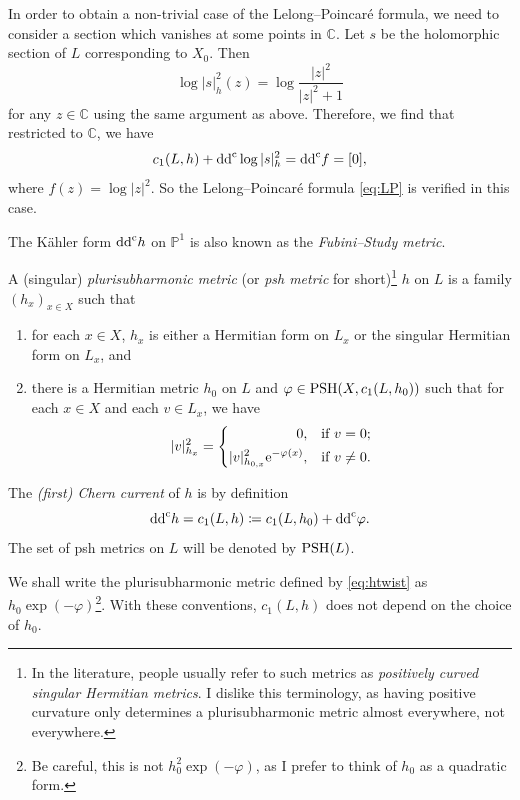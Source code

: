 \begin{example}
    In order to obtain a non-trivial case of the Lelong--Poincaré formula, we need to consider a section which vanishes at some points in $\mathbb{C}$. Let $s$ be the holomorphic section of $L$ corresponding to $X_0$. Then
    \[
    \log |s|_h^2(z)=\log \frac{|z|^2}{|z|^2+1}
    \]
    for any $z\in \mathbb{C}$ using the same argument as above. Therefore, we find that restricted to $\mathbb{C}$, we have
    \[
    c_1(L,h)+\mathrm{dd}^{\mathrm{c}} \log |s|_h^2=\mathrm{dd}^{\mathrm{c}} f=[0],
    \]
    where $f(z)=\log|z|^2$. So the Lelong--Poincaré formula \eqref{eq:LP} is verified in this case.

    The K\"ahler form $\mathrm{dd}^{\mathrm{c}} h$ on $\mathbb{P}^1$ is also known as the \emph{Fubini--Study metric}.
\end{example}


\begin{definition}\label{def:pshfunctions:L1836}
    A (singular) \emph{plurisubharmonic metric} (or \emph{psh metric} for short)\footnote{In the literature, people usually refer to such metrics as \emph{positively curved singular Hermitian metrics}. I dislike this terminology, as having positive curvature only determines a plurisubharmonic metric almost everywhere, not everywhere.} $h$ on $L$ is a family $(h_x)_{x\in X}$ such that
    \begin{enumerate}
        \item\label{itm:chapter-pshfunctions:L1857:1} for each $x\in X$, $h_x$ is either a Hermitian form on $L_x$ or the singular Hermitian form on $L_x$, and
        \item\label{itm:chapter-pshfunctions:L1857:2} there is a Hermitian metric $h_0$ on $L$ and $\varphi\in \mathrm{PSH}(X,c_1(L,h_0))$ such that for each $x\in X$ and each $v\in L_x$, we have
        \begin{equation}\label{eq:htwist}
        |v|^2_{h_x}=
        \left\{
        \begin{aligned}
            0,&\quad \textup{if }v=0;\\
            |v|^2_{h_{0,x}}\mathrm{e}^{-\varphi(x)},&\quad \textup{if }v\neq 0.
        \end{aligned}
        \right.
        \end{equation}
    \end{enumerate}
    The \emph{(first) Chern current} of $h$ is by definition
    \[
    \mathrm{dd}^{\mathrm{c}} h=c_1(L,h)\coloneqq c_1(L,h_0)+\mathrm{dd}^{\mathrm{c}}\varphi.
    \]
    The set of psh metrics on $L$ will be denoted by $\mathrm{PSH}(L)$.
\end{definition}
We shall write the plurisubharmonic metric defined by \eqref{eq:htwist} as $h_0\exp(-\varphi)$\footnote{Be careful, this is not $h_0^2\exp(-\varphi)$, as I prefer to think of $h_0$ as a quadratic form.}. With these conventions, $c_1(L,h)$ does not depend on the choice of $h_0$.

